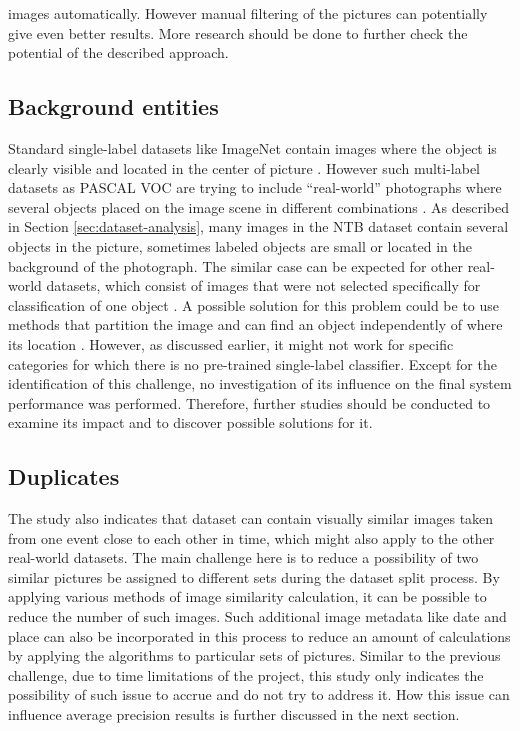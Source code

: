 images automatically. However manual filtering of the pictures can potentially give even better results. More research should be done to further check the potential of the described approach.

\subsection{Background entities}
Standard single-label datasets like ImageNet contain images where the object is clearly visible and located in the center of picture \cite{Russakovsky2015ImageNet}. However such multi-label datasets as PASCAL VOC are trying to include ``real-world'' photographs where several objects placed on the image scene in different combinations \cite{Everingham2010PASCAL-VOC}. As described in Section \ref{sec:dataset-analysis}, many images in the NTB dataset contain several objects in the picture, sometimes labeled objects are small or located in the background of the photograph. The similar case can be expected for other real-world datasets, which consist of images that were not selected specifically for classification of one object \cite{Wang2016CNN-RNN:Classification}. A possible solution for this problem could be to use methods that partition the image and can find an object independently of where its location \cite{Ren2016, Yang2015, Wei2016HCP}. However, as discussed earlier, it might not work for specific categories for which there is no pre-trained single-label classifier. Except for the identification of this challenge, no investigation of its influence on the final system performance was performed. Therefore, further studies should be conducted to examine its impact and to discover possible solutions for it.

\subsection{Duplicates}
The study also indicates that dataset can contain visually similar images taken from one event close to each other in time, which might also apply to the other real-world datasets. The main challenge here is to reduce a possibility of two similar pictures be assigned to different sets during the dataset split process. By applying various methods of image similarity calculation, it can be possible to reduce the number of such images. Such additional image metadata like date and place can also be incorporated in this process to reduce an amount of calculations by applying the algorithms to particular sets of pictures. Similar to the previous challenge, due to time limitations of the project, this study only indicates the possibility of such issue to accrue and do not try to address it. How this issue can influence average precision results is further discussed in the next section.

